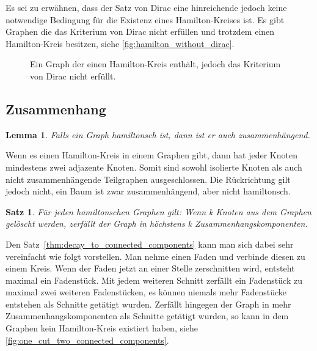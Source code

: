 \documentclass{article}
\newtheorem{mylem}{Lemma}
\newtheorem{mysat}{Satz}
\begin{document}
Es sei zu erwähnen, dass der Satz von Dirac eine hinreichende jedoch keine notwendige Bedingung für die Existenz eines Hamilton-Kreises ist. Es gibt Graphen die das Kriterium von Dirac nicht erfüllen und trotzdem einen Hamilton-Kreis besitzen, siehe \autoref{fig:hamilton_without_dirac}.

\begin{figure}[h]
	\centering
	\caption{Ein Graph der einen Hamilton-Kreis enthält, jedoch das Kriterium von Dirac nicht erfüllt.}
	\label{fig:hamilton_without_dirac}
\end{figure}


\subsection{Zusammenhang}

\begin{mylem}
	Falls ein Graph hamiltonsch ist, dann ist er auch zusammenhängend.
\end{mylem}

Wenn es einen Hamilton-Kreis in einem Graphen gibt, dann hat jeder Knoten mindestens zwei adjazente Knoten. Somit sind sowohl isolierte Knoten als auch nicht zusammenhängende Teilgraphen ausgeschlossen. Die Rückrichtung gilt jedoch nicht, ein Baum ist zwar zusammenhängend, aber nicht hamiltonsch.

\begin{mysat}\label{thm:decay_to_connected_components}
	Für jeden hamiltonschen Graphen gilt: Wenn k Knoten aus dem Graphen gelöscht werden, zerfällt der Graph in höchstens k Zusammenhangskomponenten.
\end{mysat}

Den Satz~\autoref{thm:decay_to_connected_components} kann man sich dabei sehr vereinfacht wie folgt vorstellen. Man nehme einen Faden und verbinde diesen zu einem Kreis. Wenn der Faden jetzt an einer Stelle zerschnitten wird, entsteht maximal ein Fadenstück. Mit jedem weiteren Schnitt zerfällt ein Fadenstück zu maximal zwei weiteren Fadenstücken, es können niemals mehr Fadenstücke entstehen als Schnitte getätigt wurden. Zerfällt hingegen der Graph in mehr Zusammenhangskomponenten als Schnitte getätigt wurden, so kann in dem Graphen kein Hamilton-Kreis existiert haben, siehe \autoref{fig:one_cut_two_connected_components}.
\end{document}
